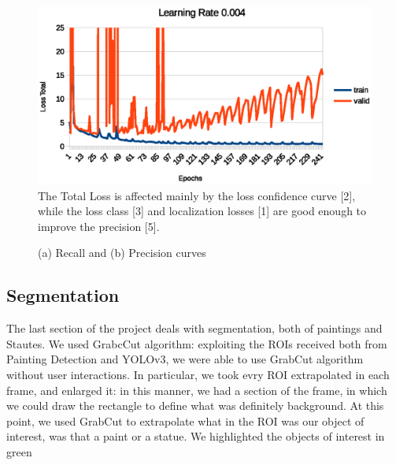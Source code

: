 \documentclass[10pt,twocolumn,letterpaper]{article}
\begin{document}
\begin{figure}[t]
\begin{center}
   \includegraphics[width=1\linewidth]{loss_total.eps}
\end{center}
   \caption{The Total Loss is affected mainly by the loss confidence curve [2], 
while the loss class [3] and localization losses [1] are good enough to improve the precision [5].}
\label{fig:long}
\label{fig:onecol}
\end{figure}

\begin{figure}
    \centering
    \caption{(a) Recall  and (b) Precision curves}
    \label{fig:foobar}
\end{figure}

\subsection{Segmentation}
The last section of the project deals with segmentation, both of paintings and Stautes.
We used GrabcCut algorithm: exploiting the ROIs received both from Painting Detection and YOLOv3, we were able to use GrabCut algorithm without user interactions.
In particular, we took evry ROI extrapolated in each frame, and enlarged it: in this manner, we had a section of the frame, in which we could draw the rectangle to define what was definitely background.
At this point, we used GrabCut to extrapolate what in the ROI was our object of interest, was that a paint or a statue.
We highlighted the objects of interest in green
\end{document}
